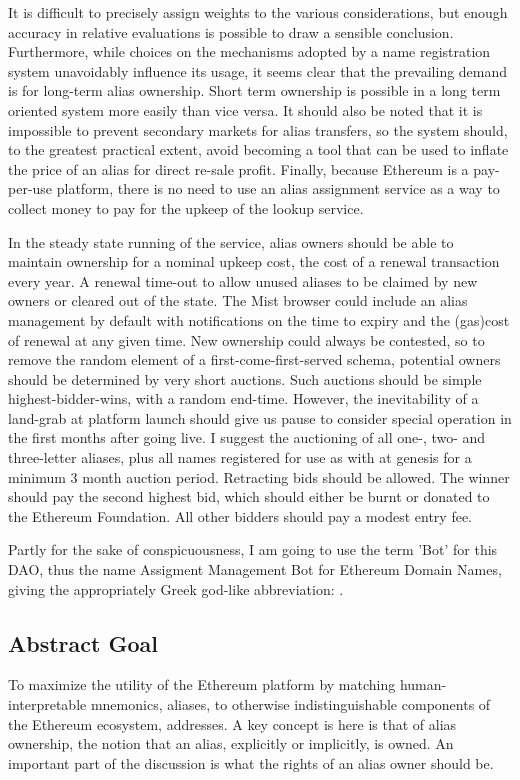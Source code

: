 \documentclass[10pt,a4paper]{article}
\begin{document}
It is difficult to precisely assign weights to the various considerations, but enough accuracy in relative evaluations is possible to draw a sensible conclusion. Furthermore, while choices on the mechanisms adopted by a name registration system unavoidably influence its usage, it seems clear that the prevailing demand is for long-term alias ownership. Short term ownership is possible in a long term oriented system more easily than vice versa. It should also be noted that it is impossible to prevent secondary markets for alias transfers, so the system should, to the greatest practical extent, avoid becoming a tool that can be used to inflate the price of an alias for direct re-sale profit. Finally, because Ethereum is a pay-per-use platform, there is no need to use an alias assignment service as a way to collect money to pay for the upkeep of the lookup service. 

In the steady state running of the service, alias owners should be able to maintain ownership for a nominal upkeep cost, \eg the cost of a renewal transaction every year. A renewal time-out to allow unused aliases to be claimed by new owners or cleared out of the state. The Mist browser could include an alias management \dapp by default with notifications on the time to expiry and the (gas)cost of renewal at any given time. New ownership could always be contested, so to remove the random element of a first-come-first-served schema, potential owners should be determined by very short auctions. Such auctions should be simple highest-bidder-wins, with a random end-time. However, the inevitability of a land-grab at platform launch should give us pause to consider special operation in the first months after going live. I suggest the auctioning of all one-, two- and three-letter aliases, plus all names registered for use as \tlds with \icann at genesis for a minimum 3 month auction period. Retracting bids should be allowed. The winner should pay the second highest bid, which should either be burnt or donated to the Ethereum Foundation. All other bidders should pay a modest entry fee.

Partly for the sake of conspicuousness, I am going to use the term 'Bot' for this DAO, thus the name Assigment Management Bot for Ethereum Domain Names, giving the appropriately Greek god-like abbreviation: \ambedon.


\subsection*{Abstract Goal}
To maximize the utility of the Ethereum platform by matching human-interpretable mnemonics, aliases, to otherwise indistinguishable components of the Ethereum ecosystem, addresses. A key concept is here is that of alias ownership, \ie the notion that an alias, explicitly or implicitly, is owned. An important part of the discussion is what the rights of an alias owner should be.
\end{document}
